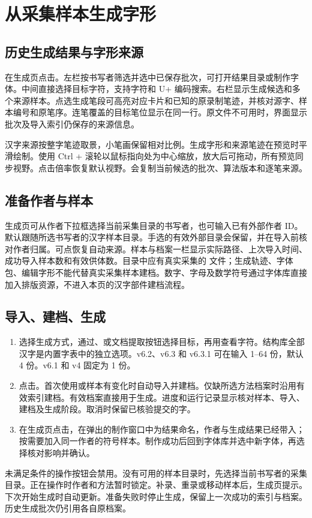 \chapter{从采集样本生成字形}\label{ch:generation}

\section{历史生成结果与字形来源}
在生成页点击。左栏按书写者筛选并选中已保存批次，可打开结果目录或制作字体。中间直接选择目标字符，支持字符和 U+ 编码搜索。右栏显示生成候选和多个来源样本。点选生成笔段可高亮对应卡片和已知的原录制笔迹，并核对源字、样本编号和原笔序。连笔覆盖的目标笔位显示在同一行。原文件不可用时，界面显示批次及导入索引仍保存的来源信息。

汉字来源按整字笔迹取景，小笔画保留相对比例。生成字形和来源笔迹在预览时平滑绘制。使用 Ctrl + 滚轮以鼠标指向处为中心缩放，放大后可拖动，所有预览同步视野。点击倍率恢复默认视野。会复制当前候选的批次、算法版本和逐笔来源。

\section{准备作者与样本}
生成页可从作者下拉框选择当前采集目录的书写者，也可输入已有外部作者 ID。默认跟随所选书写者的汉字样本目录。手选的有效外部目录会保留，并在导入前核对作者归属。可点恢复自动来源。样本与档案一栏显示实际路径、上次导入时间、成功导入样本数和有效供体数。目录中应有真实采集的  文件；生成轨迹、字体包、编辑字形不能代替真实采集样本建档。数字、字母及数学符号通过字体库直接加入排版资源，不进入本页的汉字部件建档流程。

\section{导入、建档、生成}
\begin{enumerate}
\item 选择生成方式，通过、或文档提取按钮选择目标，再用查看字符。结构库全部汉字是内置字表中的独立选项。v6.2、v6.3 和 v6.3.1 可在输入 1--64 份，默认 4 份。v6.1 和 v4 固定为 1 份。
\item 点击。首次使用或样本有变化时自动导入并建档。仅缺所选方法档案时沿用有效索引建档。有效档案直接用于生成。进度和运行记录显示核对样本、导入、建档及生成阶段。取消时保留已核验提交的字。
\item 在生成页点击，在弹出的制作窗口中为结果命名，作者与生成结果已经带入；按需要加入同一作者的符号样本。制作成功后回到字体库并选中新字体，再选择核对影响并确认。
\end{enumerate}
未满足条件的操作按钮会禁用。没有可用的样本目录时，先选择当前书写者的采集目录。正在操作时作者和方法暂时锁定。补录、重录或移动样本后，生成页提示。下次开始生成时自动更新。准备失败时停止生成，保留上一次成功的索引与档案。历史生成批次仍引用各自原档案。

